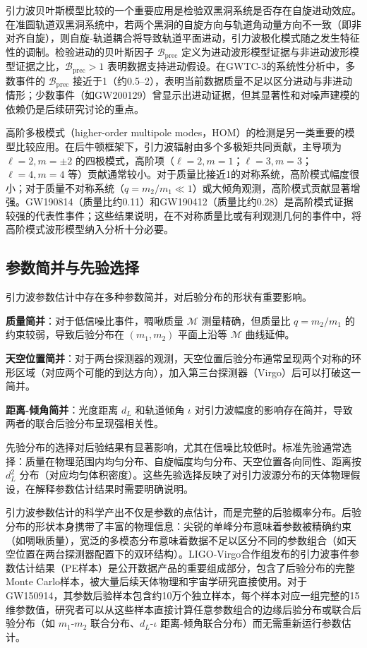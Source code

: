 引力波贝叶斯模型比较的一个重要应用是检验双黑洞系统是否存在自旋进动效应。在准圆轨道双黑洞系统中，若两个黑洞的自旋方向与轨道角动量方向不一致（即非对齐自旋），则自旋-轨道耦合将导致轨道平面进动，引力波极化模式随之发生特征性的调制。检验进动的贝叶斯因子 $\mathcal{B}_\mathrm{prec}$ 定义为进动波形模型证据与非进动波形模型证据之比，$\mathcal{B}_\mathrm{prec} > 1$ 表明数据支持进动假设。在GWTC-3的系统性分析中，多数事件的 $\mathcal{B}_\mathrm{prec}$ 接近于1（约0.5--2），表明当前数据质量不足以区分进动与非进动情形；少数事件（如GW200129）曾显示出进动证据，但其显著性和对噪声建模的依赖仍是后续研究讨论的重点。

高阶多极模式（higher-order multipole modes，HOM）的检测是另一类重要的模型比较应用。在后牛顿框架下，引力波辐射由多个多极矩共同贡献，主导项为 $\ell=2, m=\pm2$ 的四极模式，高阶项（$\ell=2,m=1$；$\ell=3,m=3$；$\ell=4,m=4$ 等）贡献通常较小。对于质量比接近1的对称系统，高阶模式幅度很小；对于质量不对称系统（$q = m_2/m_1 \ll 1$）或大倾角观测，高阶模式贡献显著增强。GW190814（质量比约0.11）和GW190412（质量比约0.28）是高阶模式证据较强的代表性事件；这些结果说明，在不对称质量比或有利观测几何的事件中，将高阶模式波形模型纳入分析十分必要。

\subsection{参数简并与先验选择}

引力波参数估计中存在多种参数简并，对后验分布的形状有重要影响。

\textbf{质量简并}：对于低信噪比事件，啁啾质量 $\mathcal{M}$ 测量精确，但质量比 $q = m_2/m_1$ 的约束较弱，导致后验分布在 $(m_1, m_2)$ 平面上沿等 $\mathcal{M}$ 曲线延伸。

\textbf{天空位置简并}：对于两台探测器的观测，天空位置后验分布通常呈现两个对称的环形区域（对应两个可能的到达方向），加入第三台探测器（Virgo）后可以打破这一简并。

\textbf{距离-倾角简并}：光度距离 $d_L$ 和轨道倾角 $\iota$ 对引力波幅度的影响存在简并，导致两者的联合后验分布呈现强相关性。

先验分布的选择对后验结果有显著影响，尤其在信噪比较低时。标准先验通常选择：质量在物理范围内均匀分布、自旋幅度均匀分布、天空位置各向同性、距离按 $d_L^2$ 分布（对应均匀体积密度）。这些先验选择反映了对引力波源分布的天体物理假设，在解释参数估计结果时需要明确说明。

引力波参数估计的科学产出不仅是参数的点估计，而是完整的后验概率分布。后验分布的形状本身携带了丰富的物理信息：尖锐的单峰分布意味着参数被精确约束（如啁啾质量），宽泛的多模态分布意味着数据不足以区分不同的参数组合（如天空位置在两台探测器配置下的双环结构）。LIGO-Virgo合作组发布的引力波事件参数估计结果（PE样本）是公开数据产品的重要组成部分，包含了后验分布的完整Monte Carlo样本，被大量后续天体物理和宇宙学研究直接使用。对于GW150914，其参数后验样本包含约10万个独立样本，每个样本对应一组完整的15维参数值，研究者可以从这些样本直接计算任意参数组合的边缘后验分布或联合后验分布（如 $m_1$-$m_2$ 联合分布、$d_L$-$\iota$ 距离-倾角联合分布）而无需重新运行参数估计。

